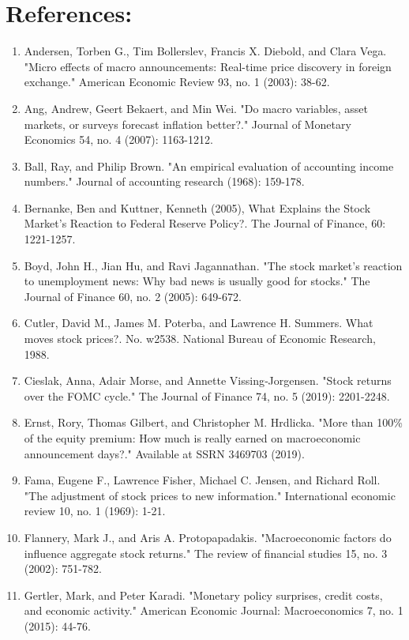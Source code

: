 \documentclass[12pt]{article}
\begin{document}
\section{References:}
\begin{enumerate}
    \item{Andersen, Torben G., Tim Bollerslev, Francis X. Diebold, and Clara Vega. "Micro effects of macro announcements: Real-time price discovery in foreign exchange." American Economic Review 93, no. 1 (2003): 38-62.}
    \item{Ang, Andrew, Geert Bekaert, and Min Wei. "Do macro variables, asset markets, or surveys forecast inflation better?." Journal of Monetary Economics 54, no. 4 (2007): 1163-1212.}
    \item{Ball, Ray, and Philip Brown. "An empirical evaluation of accounting income numbers." Journal of accounting research (1968): 159-178.}
    \item{Bernanke, Ben and Kuttner, Kenneth (2005), What Explains the Stock Market's Reaction to Federal Reserve Policy?. The Journal of Finance, 60: 1221-1257.}
    \item{Boyd, John H., Jian Hu, and Ravi Jagannathan. "The stock market's reaction to unemployment news: Why bad news is usually good for stocks." The Journal of Finance 60, no. 2 (2005): 649-672.}
    \item{Cutler, David M., James M. Poterba, and Lawrence H. Summers. What moves stock prices?. No. w2538. National Bureau of Economic Research, 1988.}
    \item{Cieslak, Anna, Adair Morse, and Annette Vissing‐Jorgensen. "Stock returns over the FOMC cycle." The Journal of Finance 74, no. 5 (2019): 2201-2248.}
    \item{Ernst, Rory, Thomas Gilbert, and Christopher M. Hrdlicka. "More than 100\% of the equity premium: How much is really earned on macroeconomic announcement days?." Available at SSRN 3469703 (2019).}
    \item{Fama, Eugene F., Lawrence Fisher, Michael C. Jensen, and Richard Roll. "The adjustment of stock prices to new information." International economic review 10, no. 1 (1969): 1-21.}
    \item{Flannery, Mark J., and Aris A. Protopapadakis. "Macroeconomic factors do influence aggregate stock returns." The review of financial studies 15, no. 3 (2002): 751-782.}
    \item{Gertler, Mark, and Peter Karadi. "Monetary policy surprises, credit costs, and economic activity." American Economic Journal: Macroeconomics 7, no. 1 (2015): 44-76.}

\end{enumerate}
\end{document}
